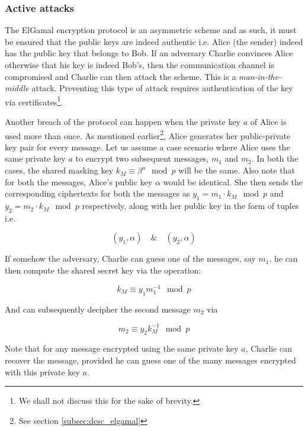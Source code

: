 \subsubsection{Active attacks}

The ElGamal encryption protocol is an asymmetric scheme and as such, it must be ensured that the public keys are indeed authentic i.e. Alice (the sender) indeed has the public key that belongs to Bob.
If an adversary Charlie convinces Alice otherwise that his key is indeed Bob's, then the communication channel is compromised and Charlie can then attack the scheme. 
This is a \textit{man-in-the-middle} attack.
Preventing this type of attack requires authentication of the key via certificates\footnote{We shall not discuss this for the sake of brevity.}.

Another breach of the protocol can happen when the private key \( a \) of Alice is used more than once.
As mentioned earlier\footnote{See section \ref{subsec:desc_elgamal}}, Alice generates her public-private key pair for every message.
Let us assume a case scenario where Alice uses the same private key \( a \) to encrypt two subsequent messages, \( m_1 \) and \( m_2 \).
In both the cases, the shared masking key \( k_M \equiv \beta^a \mod p\) will be the same.
Also note that for both the messages, Alice's public key \( \alpha \) would be identical.
She then sends the corresponding ciphertexts for both the messages as \( y_1 = m_1 \cdot k_M \mod p \) and \( y_2 = m_2 \cdot k_M \mod p \) respectively, along with her public key in the form of tuples i.e.

\begin{equation*}
    (y_1, \alpha) \quad \& \quad (y_2, \alpha)
\end{equation*}

If somehow the adversary, Charlie can guess one of the messages, say \( m_1 \), he can then compute the shared secret key via the operation:

\begin{equation*}
    k_M \equiv y_1 m_1^{-1} \mod p
\end{equation*}

And can subsequently decipher the second message \( m_2 \) via

\begin{equation*}
    m_2 \equiv y_2 k_M^{-1} \mod p
\end{equation*}

Note that for any message encrypted using the same private key \( a \), Charlie can recover the message, provided he can guess one of the many messages encrypted with this private key \( a \).

